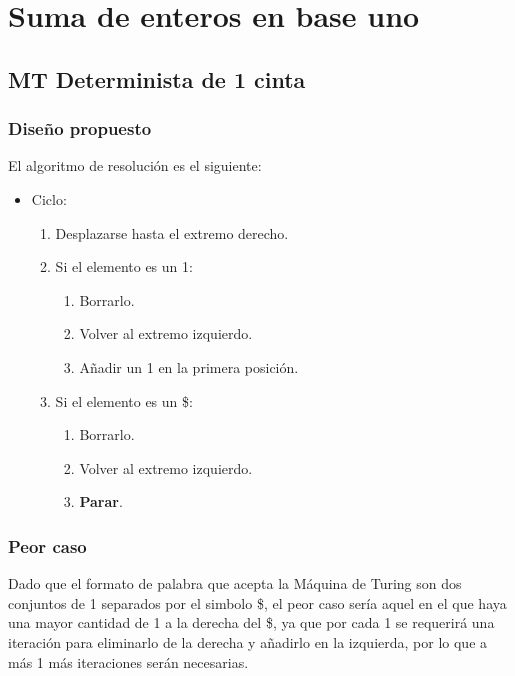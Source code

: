 \section{Suma de enteros en base uno}


\subsection{MT Determinista de 1 cinta}

\subsubsection*{Diseño propuesto}
El algoritmo de resolución es el siguiente:

\begin{itemize}
    \item Ciclo:
    \begin{enumerate}[1.]
        \item Desplazarse hasta el extremo derecho.
        \item Si el elemento es un 1:
        \begin{enumerate}[1.]
            \item Borrarlo.
            \item Volver al extremo izquierdo.
            \item Añadir un 1 en la primera posición.
        \end{enumerate}
        \item Si el elemento es un \$:
        \begin{enumerate}[1.]
            \item Borrarlo.
            \item Volver al extremo izquierdo.
            \item \textbf{Parar}.
        \end{enumerate}
    \end{enumerate}
\end{itemize}



\subsubsection*{Peor caso}
Dado que el formato de palabra que acepta la Máquina de Turing son dos conjuntos de 1 separados por el simbolo \$, el peor caso sería aquel en el que haya una mayor cantidad de 1 a la derecha del \$, ya que por cada 1 se requerirá una iteración para eliminarlo de la derecha y añadirlo en la izquierda, por lo que a más 1 más iteraciones serán necesarias.

